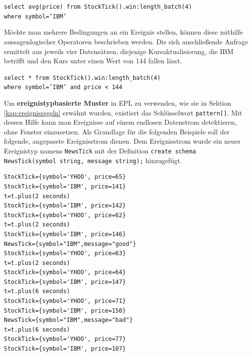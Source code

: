 \documentclass{acm_proc_article-sp}
\begin{document}
\texttt{select  avg(price) from StockTick().win:length\_batch(4)\\where symbol='IBM'}
\begin{table}[ht]
    \caption{\texttt{batch}-Längenfenster}
    \label{table:warteschlange-batch}\vspace{0.2cm}
\end{table}

Möchte man mehrere Bedingungen an ein Ereignis stellen, können diese mithilfe 
aussagenlogischer Operatoren beschrieben werden. Die sich anschließende Anfrage ermittelt 
aus jeweils vier Datensätzen, diejenige Kursaktualisierung, die IBM betrifft und den Kurs 
unter einen Wert von 144 fallen lässt.

\texttt{select * from StockTick().win:length\_batch(4)\\where symbol='IBM' and 
price < 144}

Um \textbf{ereignistypbasierte Muster} in EPL zu verwenden, wie sie in Sektion 
\ref{kap:ereignisregeln} erwähnt wurden, existiert das Schlüsselwort \texttt{pattern[]}. 
Mit dessen Hilfe kann man Ereignisse auf einem endlosen Datenstrom detektieren, ohne 
Fenster einzusetzen. Als Grundlage für die folgenden Beispiele soll der folgende, 
angepasste Ereignisstrom dienen. Dem Ereignisstrom wurde ein neuer Ereignistyp namens 
\texttt{NewsTick} mit der Definition
\texttt{create schema NewsTick(symbol string, message string);} hinzugefügt.
\begin{verbatim}
StockTick={symbol='YHOO', price=65}
StockTick={symbol='IBM', price=141}
t=t.plus(2 seconds)
StockTick={symbol='IBM', price=142}
StockTick={symbol='YHOO', price=62}
t=t.plus(2 seconds)
StockTick={symbol='IBM', price=146}
NewsTick={symbol="IBM",message="good"}
StockTick={symbol='YHOO', price=63}
t=t.plus(2 seconds)
StockTick={symbol='YHOO', price=64}
StockTick={symbol='IBM', price=147}
t=t.plus(6 seconds)
StockTick={symbol='YHOO', price=71}
StockTick={symbol='IBM', price=150}
NewsTick={symbol="IBM",message="bad"}
t=t.plus(6 seconds)
StockTick={symbol='YHOO', price=77}
StockTick={symbol='IBM', price=107}
\end{verbatim}
\end{document}
